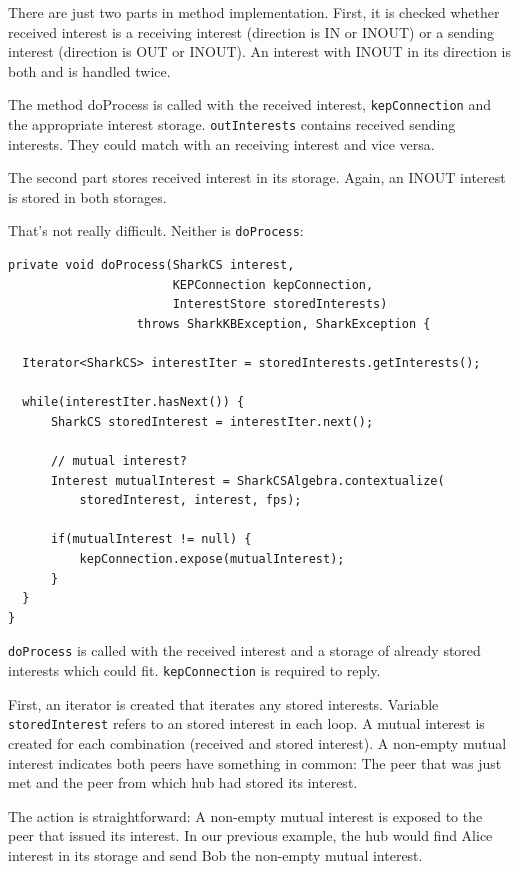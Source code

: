 {There are just two parts in method implementation. First, it is checked whether received interest is a receiving interest (direction is IN or INOUT) or a
sending interest (direction is OUT or INOUT). An interest with INOUT in its direction is both and is handled twice.

The method doProcess is called with the received interest, {\tt kepConnection} and the appropriate interest storage. {\tt outInterests} contains received sending interests. They could match with an receiving interest and vice versa.

The second part stores received interest in its storage. Again, an INOUT interest is stored in both storages.

That's not really difficult. Neither is {\tt doProcess}:

\begin{verbatim}
private void doProcess(SharkCS interest,
                       KEPConnection kepConnection,
                       InterestStore storedInterests)
                  throws SharkKBException, SharkException {

  Iterator<SharkCS> interestIter = storedInterests.getInterests();

  while(interestIter.hasNext()) {
      SharkCS storedInterest = interestIter.next();

      // mutual interest?
      Interest mutualInterest = SharkCSAlgebra.contextualize(
          storedInterest, interest, fps);

      if(mutualInterest != null) {
          kepConnection.expose(mutualInterest);
      }
  }
}
\end{verbatim}

{\tt doProcess} is called with the received interest and a storage of already stored interests which could fit. {\tt kepConnection} is required to reply.

First, an iterator is created that iterates any stored interests. Variable
{\tt storedInterest} refers to an stored interest in each loop. A mutual interest is created for each combination (received and stored interest).
A non-empty mutual interest indicates both peers have something in common: The peer that was just met and the peer from which hub had stored its interest.

The action is straightforward: A non-empty mutual interest is exposed to
the peer that issued its interest. In our previous example, the hub would find Alice interest in its storage and send Bob the non-empty mutual interest.

}
